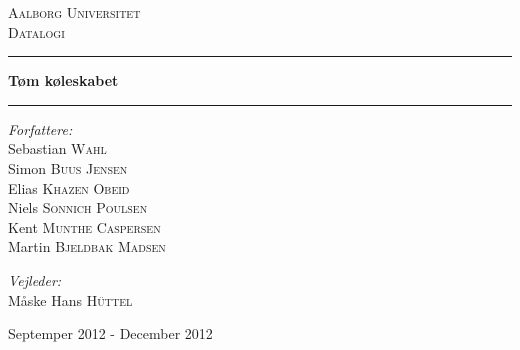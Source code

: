 \begin{titlingpage}
\centering
\vspace*{1.0cm}

\textsc{\LARGE Aalborg Universitet}\\[1.5cm]
\textsc{\Large Datalogi}\\[0.25cm]

\hrule
{ \huge \bfseries Tøm køleskabet}
\vspace{0.3cm}
\hrule
\vspace{0.75cm}

  \begin{flushleft} \large
    \vspace{0pt}
    \emph{Forfattere:}\\
    Sebastian \textsc{Wahl}\\
    Simon \textsc{Buus Jensen}\\
    Elias \textsc{Khazen Obeid}\\
    Niels \textsc{Sonnich Poulsen}\\
    Kent \textsc{Munthe Caspersen}\\
    Martin \textsc{Bjeldbak Madsen}\\
  \end{flushleft}

  \begin{flushright} \large
  \vspace{-132pt}
  \emph{Vejleder:}\\
  Måske Hans \textsc{H\"{u}ttel}
  \end{flushright}


\vfill

{\large Septemper 2012 - December 2012}

\end{titlingpage}
